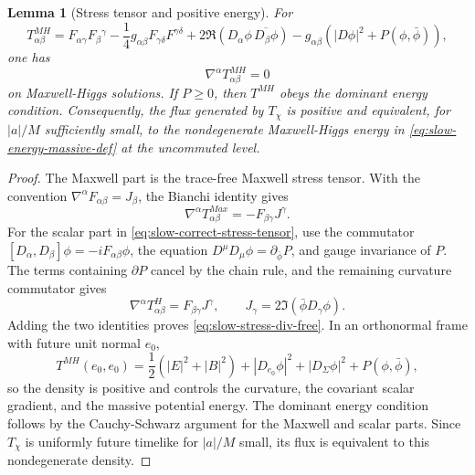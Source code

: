 \documentclass[11pt]{article}
\numberwithin{equation}{section}
\theoremstyle{plain}
\newtheorem{lemma}[theorem]{Lemma}
\theoremstyle{definition}
\theoremstyle{remark}
\begin{document}
\begin{lemma}[Stress tensor and positive energy]\label{lem:slow-MH-stress-energy}
For
\begin{equation}\label{eq:slow-correct-stress-tensor}
 T^{MH}_{\alpha\beta}=
 F_{\alpha\gamma}F_{\beta}{}^{\gamma}
 -\frac14g_{\alpha\beta}F_{\gamma\delta}F^{\gamma\delta}
 +2\Re(D_\alpha\phi\,\overline{D_\beta\phi})
 -g_{\alpha\beta}\left(|D\phi|^2+P(\phi,\bar\phi)\right),
\end{equation}
one has
\begin{equation}\label{eq:slow-stress-div-free}
 \nabla^\alpha T^{MH}_{\alpha\beta}=0
\end{equation}
on Maxwell-Higgs solutions.  If \(P\ge0\), then \(T^{MH}\) obeys the dominant energy condition.  Consequently, the flux generated by \(T_\chi\) is positive and equivalent, for \(|a|/M\) sufficiently small, to the nondegenerate Maxwell-Higgs energy in \eqref{eq:slow-energy-massive-def} at the uncommuted level.
\end{lemma}

\begin{proof}
The Maxwell part is the trace-free Maxwell stress tensor.  With the convention \(\nabla^\alpha F_{\alpha\beta}=J_\beta\), the Bianchi identity gives
\begin{equation}
 \nabla^\alpha T^{Max}_{\alpha\beta}=-F_{\beta\gamma}J^\gamma.
\end{equation}
For the scalar part in \eqref{eq:slow-correct-stress-tensor}, use the commutator \([D_\alpha,D_\beta]\phi=-iF_{\alpha\beta}\phi\), the equation \(D^\mu D_\mu\phi=\partial_{\bar\phi}P\), and gauge invariance of \(P\).  The terms containing \(\partial P\) cancel by the chain rule, and the remaining curvature commutator gives
\begin{equation}
 \nabla^\alpha T^{H}_{\alpha\beta}=F_{\beta\gamma}J^\gamma,
 \qquad
 J_\gamma=2\Im(\bar\phi D_\gamma\phi).
\end{equation}
Adding the two identities proves \eqref{eq:slow-stress-div-free}.  In an orthonormal frame with future unit normal \(e_0\),
\begin{equation}
 T^{MH}(e_0,e_0)=\frac12(|E|^2+|B|^2)+|D_{e_0}\phi|^2+|D_{\Sigma}\phi|^2+P(\phi,\bar\phi),
\end{equation}
so the density is positive and controls the curvature, the covariant scalar gradient, and the massive potential energy.  The dominant energy condition follows by the Cauchy-Schwarz argument for the Maxwell and scalar parts.  Since \(T_\chi\) is uniformly future timelike for \(|a|/M\) small, its flux is equivalent to this nondegenerate density.
\end{proof}
\end{document}
